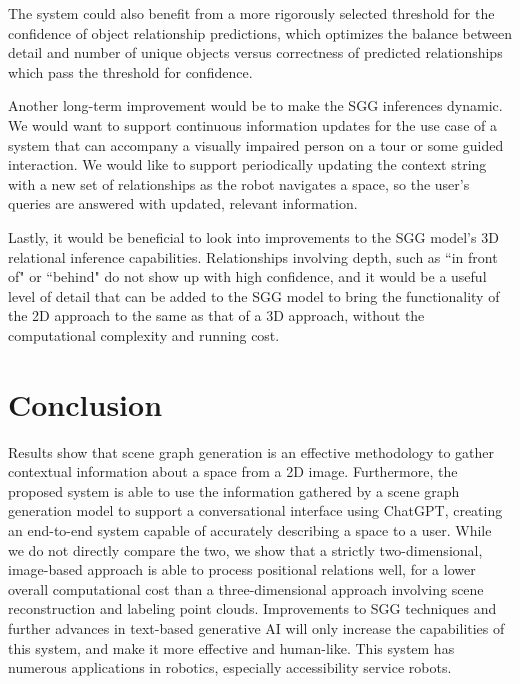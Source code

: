 \documentclass[letterpaper, 10 pt, conference]{ieeeconf}  %
\begin{document}
    The system could also benefit from a more rigorously selected threshold for the confidence of object relationship predictions, which optimizes the balance between detail and number of unique objects versus correctness of predicted relationships which pass the threshold for confidence.

    Another long-term improvement would be to make the SGG inferences dynamic. We would want to support continuous information updates for the use case of a system that can accompany a visually impaired person on a tour or some guided interaction. We would like to support periodically updating the context string with a new set of relationships as the robot navigates a space, so the user's queries are answered with updated, relevant information.

    Lastly, it would be beneficial to look into improvements to the SGG model's 3D relational inference capabilities. Relationships involving depth, such as ``in front of" or ``behind" do not show up with high confidence, and it would be a useful level of detail that can be added to the SGG model to bring the functionality of the 2D approach to the same as that of a 3D approach, without the computational complexity and running cost.

\section{Conclusion}
    Results show that scene graph generation is an effective methodology to gather contextual information about a space from a 2D image. Furthermore, the proposed system is able to use the information gathered by a scene graph generation model to support a conversational interface using ChatGPT, creating an end-to-end system capable of accurately describing a space to a user. While we do not directly compare the two, we show that a strictly two-dimensional, image-based approach is able to process positional relations well, for a lower overall computational cost than a three-dimensional approach involving scene reconstruction and labeling point clouds. Improvements to SGG techniques and further advances in text-based generative AI will only increase the capabilities of this system, and make it more effective and human-like. This system has numerous applications in robotics, especially accessibility service robots.
\end{document}

